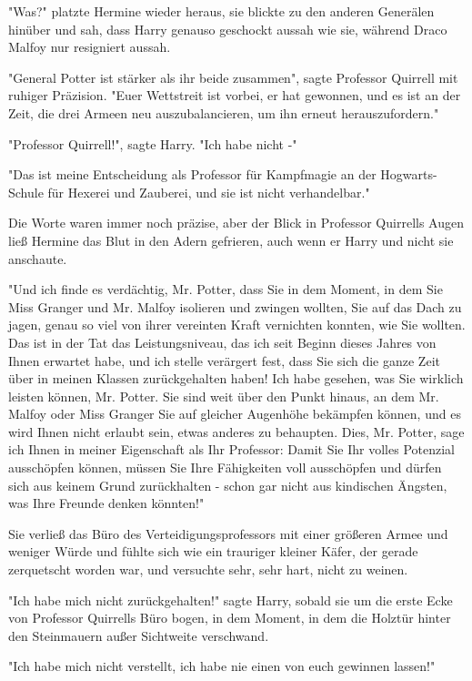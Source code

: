 {"Was?" platzte Hermine wieder heraus, sie blickte zu den anderen Generälen hinüber und sah, dass Harry genauso geschockt aussah wie sie, während Draco Malfoy nur resigniert aussah.

"General Potter ist stärker als ihr beide zusammen", sagte Professor Quirrell mit ruhiger Präzision. "Euer Wettstreit ist vorbei, er hat gewonnen, und es ist an der Zeit, die drei Armeen neu auszubalancieren, um ihn erneut herauszufordern."

"Professor Quirrell!", sagte Harry. "Ich habe nicht -"

"Das ist meine Entscheidung als Professor für Kampfmagie an der Hogwarts-Schule für Hexerei und Zauberei, und sie ist nicht verhandelbar."

Die Worte waren immer noch präzise, aber der Blick in Professor Quirrells Augen ließ Hermine das Blut in den Adern gefrieren, auch wenn er Harry und nicht sie anschaute.

"Und ich finde es verdächtig, Mr. Potter, dass Sie in dem Moment, in dem Sie Miss Granger und Mr. Malfoy isolieren und zwingen wollten, Sie auf das Dach zu jagen, genau so viel von ihrer vereinten Kraft vernichten konnten, wie Sie wollten. Das ist in der Tat das Leistungsniveau, das ich seit Beginn dieses Jahres von Ihnen erwartet habe, und ich stelle verärgert fest, dass Sie sich die ganze Zeit über in meinen Klassen zurückgehalten haben! Ich habe gesehen, was Sie wirklich leisten können, Mr. Potter. Sie sind weit über den Punkt hinaus, an dem Mr. Malfoy oder Miss Granger Sie auf gleicher Augenhöhe bekämpfen können, und es wird Ihnen nicht erlaubt sein, etwas anderes zu behaupten. Dies, Mr. Potter, sage ich Ihnen in meiner Eigenschaft als Ihr Professor: Damit Sie Ihr volles Potenzial ausschöpfen können, müssen Sie Ihre Fähigkeiten voll ausschöpfen und dürfen sich aus keinem Grund zurückhalten - schon gar nicht aus kindischen Ängsten, was Ihre Freunde denken könnten!"

Sie verließ das Büro des Verteidigungsprofessors mit einer größeren Armee und weniger Würde und fühlte sich wie ein trauriger kleiner Käfer, der gerade zerquetscht worden war, und versuchte sehr, sehr hart, nicht zu weinen.

"Ich habe mich nicht zurückgehalten!" sagte Harry, sobald sie um die erste Ecke von Professor Quirrells Büro bogen, in dem Moment, in dem die Holztür hinter den Steinmauern außer Sichtweite verschwand.

"Ich habe mich nicht verstellt, ich habe nie einen von euch gewinnen lassen!"

}
